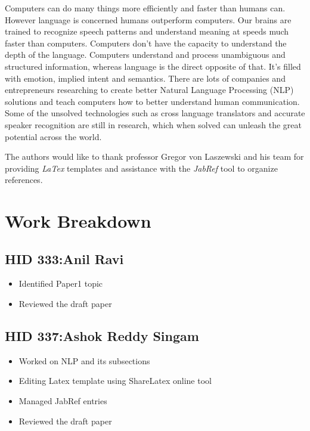\documentclass[sigconf]{acmart}
\begin{document}
Computers can do many things more efficiently and faster than humans can. However language is concerned humans outperform computers. Our brains are trained to recognize speech patterns and understand meaning at speeds much faster than computers. Computers don't have the capacity to understand the depth of the language. Computers understand and process unambiguous and structured information, whereas language is the direct opposite of that. It's filled with emotion, implied intent and semantics. There are lots of companies and entrepreneurs researching to create better Natural Language Processing (NLP) solutions and teach computers how to better understand human communication. Some of the unsolved technologies such as cross language translators and accurate speaker recognition are still in research, which when solved can unleash the great potential across the world.

\begin{acks}

  The authors would like to thank professor Gregor von Laszewski and his team for providing \textit{LaTex} templates and assistance with the \textit{JabRef} tool to organize references.


\end{acks}


 
\newpage
\appendix
\section{Work Breakdown}
\subsection{HID 333:Anil Ravi}
\begin{itemize}
  \item Identified Paper1 topic
  \item Reviewed the draft paper
\end{itemize}
\subsection{HID 337:Ashok Reddy Singam}
\begin{itemize}
  \item Worked on NLP and its subsections
  \item Editing Latex template using ShareLatex online tool
  \item Managed JabRef entries 
  \item Reviewed the draft paper 
\end{itemize}
\end{document}
